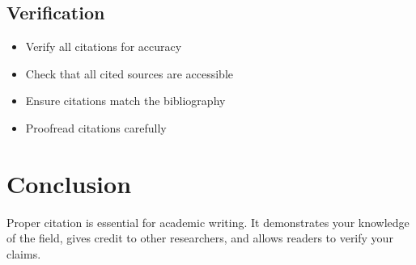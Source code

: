\documentclass{article}
\begin{document}
\subsection{Verification}
\begin{itemize}
    \item Verify all citations for accuracy
    \item Check that all cited sources are accessible
    \item Ensure citations match the bibliography
    \item Proofread citations carefully
\end{itemize}

\section{Conclusion}
Proper citation is essential for academic writing. It demonstrates your knowledge of the field, gives credit to other researchers, and allows readers to verify your claims.



\end{document}
